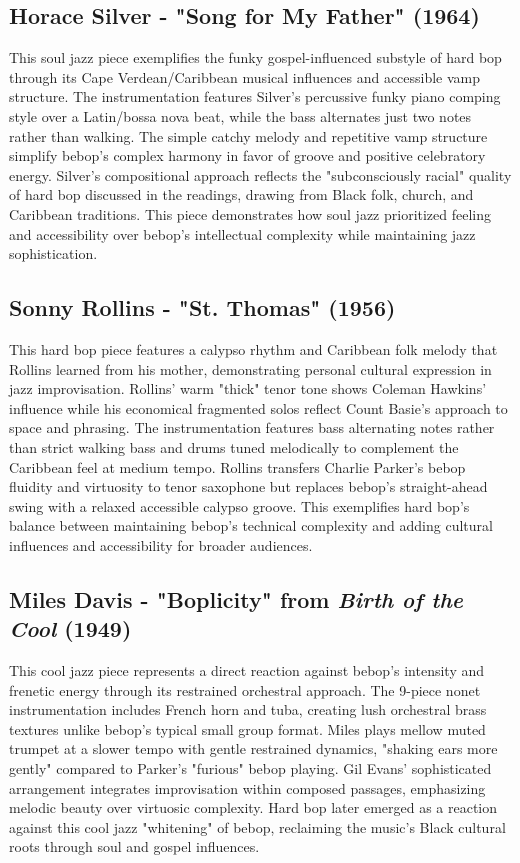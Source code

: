 \documentclass[11pt]{article}
\begin{document}
\subsection*{Horace Silver - "Song for My Father" (1964)}
This soul jazz piece exemplifies the funky gospel-influenced substyle of hard bop through its Cape Verdean/Caribbean musical influences and accessible vamp structure. The instrumentation features Silver's percussive funky piano comping style over a Latin/bossa nova beat, while the bass alternates just two notes rather than walking. The simple catchy melody and repetitive vamp structure simplify bebop's complex harmony in favor of groove and positive celebratory energy. Silver's compositional approach reflects the "subconsciously racial" quality of hard bop discussed in the readings, drawing from Black folk, church, and Caribbean traditions. This piece demonstrates how soul jazz prioritized feeling and accessibility over bebop's intellectual complexity while maintaining jazz sophistication.

\subsection*{Sonny Rollins - "St. Thomas" (1956)}
This hard bop piece features a calypso rhythm and Caribbean folk melody that Rollins learned from his mother, demonstrating personal cultural expression in jazz improvisation. Rollins' warm "thick" tenor tone shows Coleman Hawkins' influence while his economical fragmented solos reflect Count Basie's approach to space and phrasing. The instrumentation features bass alternating notes rather than strict walking bass and drums tuned melodically to complement the Caribbean feel at medium tempo. Rollins transfers Charlie Parker's bebop fluidity and virtuosity to tenor saxophone but replaces bebop's straight-ahead swing with a relaxed accessible calypso groove. This exemplifies hard bop's balance between maintaining bebop's technical complexity and adding cultural influences and accessibility for broader audiences.

\subsection*{Miles Davis - "Boplicity" from \emph{Birth of the Cool} (1949)}
This cool jazz piece represents a direct reaction against bebop's intensity and frenetic energy through its restrained orchestral approach. The 9-piece nonet instrumentation includes French horn and tuba, creating lush orchestral brass textures unlike bebop's typical small group format. Miles plays mellow muted trumpet at a slower tempo with gentle restrained dynamics, "shaking ears more gently" compared to Parker's "furious" bebop playing. Gil Evans' sophisticated arrangement integrates improvisation within composed passages, emphasizing melodic beauty over virtuosic complexity. Hard bop later emerged as a reaction against this cool jazz "whitening" of bebop, reclaiming the music's Black cultural roots through soul and gospel influences.
\end{document}
